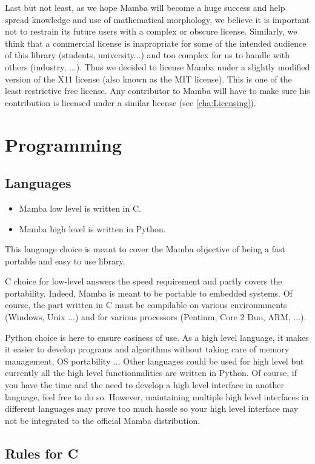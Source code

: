 \documentclass[a4paper,10pt,oneside]{article}
\begin{document}
Last but not least, as we hope Mamba will become a huge success and
help spread knowledge and use of mathematical morphology, we believe
it is important not to restrain its future users with a complex or
obscure license. Similarly, we think that a commercial license is inapropriate
for some of the intended audience of this library (students, university...)
and too complex for us to handle with others (industry, ...). Thus
we decided to license Mamba under a slightly modified version of the
X11 license (also known as the MIT license). This is one of the least
restrictive free license. Any contributor to Mamba will have to make
sure his contribution is licensed under a similar license (see \ref{cha:Licensing}).


\section{Programming}


\subsection{Languages}
\begin{itemize}
\item Mamba low level is written in C. 
\item Mamba high level is written in Python. 
\end{itemize}
This language choice is meant to cover the Mamba objective of being
a fast portable and easy to use library.

C choice for low-level answers the speed requirement and partly covers
the portability. Indeed, Mamba is meant to be portable to embedded
systems. Of course, the part written in C must be compilable on various
environmments (Windows, Unix ...) and for various processors (Pentium,
Core 2 Duo, ARM, ...).

Python choice is here to ensure easiness of use. As a high level language,
it makes it easier to develop programs and algorithms without taking
care of memory management, OS portability ... Other languages could
be used for high level but currently all the high level functionnalities
are written in Python. Of course, if you have the time and the need
to develop a high level interface in another language, feel free to
do so. However, maintaining multiple high level interfaces in different
languages may prove too much hassle so your high level interface may
not be integrated to the official Mamba distribution.

\subsection{Rules for C}
\end{document}
